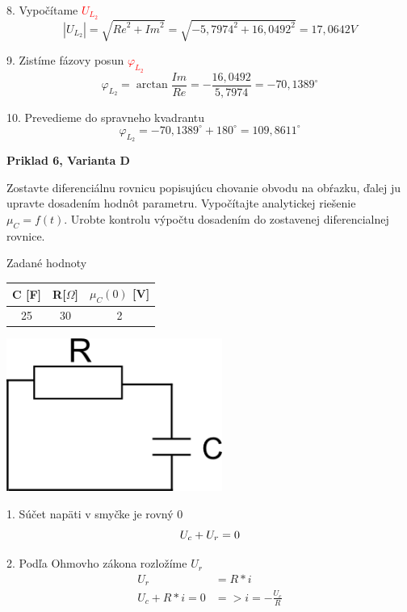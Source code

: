 \documentclass[a4paper,12pt]{article}
\begin{document}
8. Vypočítame  \textcolor{red}{$U_{L_2}$}
\begin{equation*}
|U_{L_2}| = \sqrt{{Re}^2 + {Im}^2} = \sqrt{-5,7974^2 + 16,0492^2} =17,0642V
\end{equation*}

9. Zistíme fázovy posun \textcolor{red}{$\varphi_{L_2}$}
\begin{equation*}
\varphi_{L_2} = \arctan \frac{Im}{Re} = -\frac{16,0492}{5,7974} = -70,1389^{\circ}
\end{equation*}

10. Prevedieme do spravneho kvadrantu
\begin{equation*}
\varphi_{L_2} =  -70,1389^{\circ} + 180^{\circ} = 109,8611^{\circ}
\end{equation*}

\newpage
\begin{center}
\textbf{Priklad 6, Varianta D}
\end{center}
\bigskip
Zostavte diferenciálnu rovnicu popisujúcu chovanie obvodu na obŕazku, ďalej ju upravte dosadením hodnôt parametru. Vypočítajte analytickej riešenie
$\mu_C = f(t)$. Urobte kontrolu výpočtu dosadením do zostavenej diferencialnej rovnice.
\bigskip

Zadané hodnoty

\begin{tabular} {|  c | c | c |}
\hline
C [F] & R[$\Omega$] & $\mu_C(0)$ [V] \\ \hline
25 & 30 & 2\\ \hline
\end{tabular}
\bigskip

\includegraphics[height=5cm]{img/pr6}

1. Súčet napäti v smyčke je rovný 0
\begin {equation*}
	U_c + U_r = 0 \\	
\end{equation*}

2. Podľa Ohmovho zákona rozložíme $U_r$
\begin {equation*}
    \begin{split}
	U_r &= R * i \\
	U_c + R * i = 0 &=> i=-\frac{U_c}{R}
    \end{split}
\end{equation*}
\end{document}
